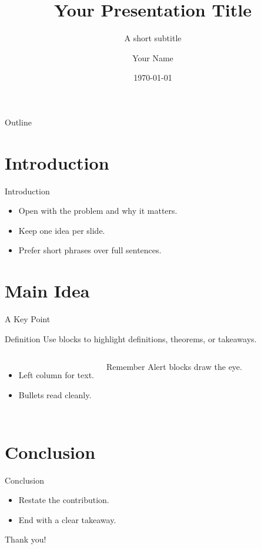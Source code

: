 \documentclass[aspectratio=169]{beamer}
\title{Your Presentation Title}
\subtitle{A short subtitle}
\author{Your Name}
\institute{Your Institution}
\date{\today}
\begin{document}
\begin{frame}
  \titlepage
\end{frame}

\begin{frame}{Outline}
  \tableofcontents
\end{frame}

\section{Introduction}
\begin{frame}{Introduction}
  \begin{itemize}
    \item Open with the problem and why it matters.
    \item Keep one idea per slide.
    \item Prefer short phrases over full sentences.
  \end{itemize}
\end{frame}

\section{Main Idea}
\begin{frame}{A Key Point}
  \begin{block}{Definition}
    Use blocks to highlight definitions, theorems, or takeaways.
  \end{block}
  \begin{columns}
      \begin{itemize}
        \item Left column for text.
        \item Bullets read cleanly.
      \end{itemize}
      \begin{alertblock}{Remember}
        Alert blocks draw the eye.
      \end{alertblock}
  \end{columns}
\end{frame}

\section{Conclusion}
\begin{frame}{Conclusion}
  \begin{itemize}
    \item Restate the contribution.
    \item End with a clear takeaway.
  \end{itemize}
  \vfill
  \centering\Large Thank you!
\end{frame}
\end{document}

